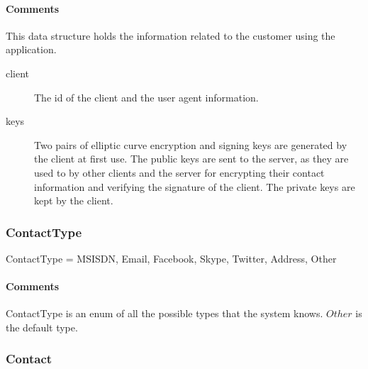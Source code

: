 \documentclass[a4paper,10pt]{article}
\begin{document}
\begin{inparaitem}[ ]
 \item \unique
 \item \secure
 \item \persistent
\end{inparaitem}

\paragraph*{Comments}
This data structure holds the information related to the customer using the application.

\SpecialItem
\begin{description}
 \item[client] The id of the client and the user agent information.
 \item[keys] Two pairs of elliptic curve encryption and signing keys are generated by the client at first use. The public keys are sent to the server, as they are used to by other 
clients and the server for encrypting their contact information and verifying the signature of the client. The private keys are kept by the client.
\end{description}

\subsubsection{ContactType}
\begin{verbbox}
ContactType = { MSISDN, Email, Facebook, Skype, Twitter, Address,
                Other }
\end{verbbox}
\begin{center}
\theverbbox
\end{center}

\begin{inparaitem}[ ]
 \item \infrastructure
\end{inparaitem}

\paragraph*{Comments}
ContactType is an enum of all the possible types that the system knows. $Other$ is the default type.

\subsubsection{Contact}
\label{sec:structure:client:contact}
\end{document}
